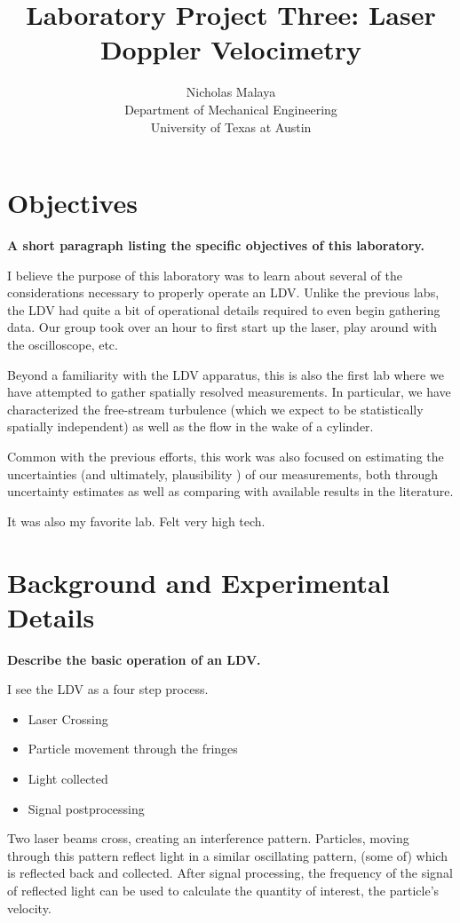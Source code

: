 \documentclass{article}
\title{\bf{Laboratory Project Three: Laser Doppler Velocimetry}}
\author{Nicholas Malaya \\ Department of Mechanical Engineering \\
University of Texas at Austin} \date{}
\begin{document}
\maketitle
\date{}
\newpage
\section{Objectives}

\textbf{A short paragraph listing the specific objectives of this laboratory.}   

I believe the purpose of this laboratory was to learn about
several of the considerations necessary to properly operate an
LDV. Unlike the previous labs, the LDV had quite a bit of operational
details required to even begin gathering data. Our group took over an
hour to first start up the laser, play around with the oscilloscope,
etc. 

Beyond a familiarity with the LDV apparatus, this is also the first lab
where we have attempted to gather spatially resolved measurements. In
particular, we have characterized the free-stream turbulence (which we
expect to be statistically spatially independent) as well as the flow in
the wake of a cylinder. 

Common with the previous efforts, this work was also focused on
estimating the uncertainties (and ultimately, plausibility ) of our
measurements, both through uncertainty estimates as well as comparing
with available results in the literature. 

It was also my favorite lab. Felt very high tech. 

\section{Background and Experimental Details}

\textbf{Describe the basic operation of an LDV.}

I see the LDV as a four step process. 

\begin{itemize}
 \item Laser Crossing
 \item Particle movement through the fringes
 \item Light collected
 \item Signal postprocessing
\end{itemize}

Two laser beams cross, creating an interference pattern. Particles,
moving through this pattern reflect light in a similar oscillating
pattern, (some of) which is reflected back and collected. After signal
processing, the frequency of the signal of reflected light can be used
to calculate the quantity of interest, the particle's velocity. 
\end{document}
